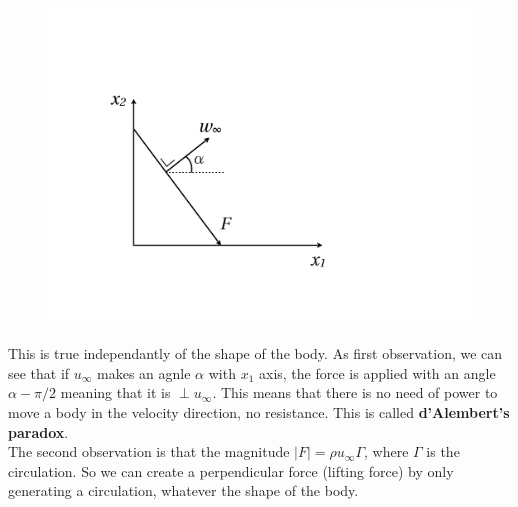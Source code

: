 	\begin{figure}
		\vspace{-0mm}	
		\includegraphics[scale=0.18]{ch3/8}	
		\end{figure}
	This is true independantly of the shape of the body. As first observation, we can see that if $u_\infty$ makes an agnle $\alpha$ with $x_1$ axis, the force is applied with an angle $\alpha - \pi /2$ meaning that it is $\perp u_\infty$. This means that there is no need of power to move a body in the velocity direction, no resistance. This is called \textbf{d'Alembert's paradox}. \\
	The second observation is that the magnitude $|F| = \rho u_\infty\Gamma$, where $\Gamma$ is the circulation. So we can create a perpendicular force (lifting force) by only generating a circulation, whatever the shape of the body. 
	

